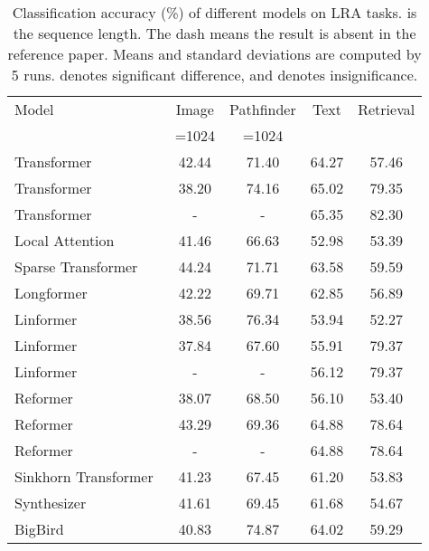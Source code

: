 \documentclass{article}
\begin{document}
\begin{table}[tb]
\centering
\caption{Classification accuracy (\%) of different models on LRA tasks.  is the sequence length. The dash means the result is absent in the reference paper. Means and standard deviations are computed by 5 runs.  denotes significant difference, and  denotes insignificance.}
\label{table:lra}
\renewcommand{\arraystretch}{1.2}
\begin{tabular}{lcccc}
\hline
\hline
Model    &Image        &Pathfinder    &Text       &Retrieval   \\
         &=1024     &=1024      &   &       \\
\hline
Transformer~\cite{tay2020long}          & 42.44     & 71.40    & 64.27     & 57.46      \\
Transformer~\cite{xiong2021nystr}       & 38.20     & 74.16    & 65.02     & 79.35      \\
Transformer~\cite{zhu2021long}          & -         & -        & 65.35     & 82.30     \\
\hline
Local Attention~\cite{tay2020long}      & 41.46     & 66.63    & 52.98     & 53.39      \\
\hline
Sparse Transformer~\cite{tay2020long}    & 44.24     & 71.71    & 63.58     & 59.59      \\
\hline
Longformer~\cite{tay2020long}           & 42.22     & 69.71    & 62.85     & 56.89      \\
\hline
Linformer~\cite{tay2020long}            & 38.56     & 76.34    & 53.94     & 52.27      \\
Linformer~\cite{xiong2021nystr}         & 37.84     & 67.60    & 55.91     & 79.37      \\
Linformer~\cite{zhu2021long}            & -         & -        & 56.12     & 79.37     \\
\hline
Reformer~\cite{tay2020long}             & 38.07     & 68.50    & 56.10     & 53.40      \\
Reformer~\cite{xiong2021nystr}          & 43.29     & 69.36    & 64.88     & 78.64      \\
Reformer~\cite{zhu2021long}             & -         & -        & 64.88     & 78.64     \\
\hline
Sinkhorn Transformer~\cite{tay2020long}  & 41.23     & 67.45    & 61.20     & 53.83      \\
\hline
Synthesizer~\cite{tay2020long}          & 41.61     & 69.45    & 61.68     & 54.67      \\
\hline
BigBird~\cite{tay2020long}              & 40.83     & 74.87    & 64.02     & 59.29      \\

\end{tabular}
\end{table}
\end{document}
